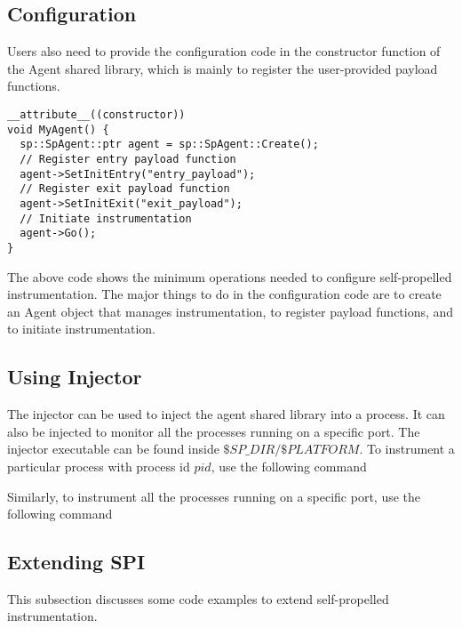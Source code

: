 \subsection{Configuration}
Users also need to provide the configuration code in the constructor
function of
the Agent shared library, which is mainly to register the user-provided payload
functions.
\lstset{numbers=left}
\begin{lstlisting}[caption=Configuration code]
__attribute__((constructor))
void MyAgent() {
  sp::SpAgent::ptr agent = sp::SpAgent::Create();
  // Register entry payload function
  agent->SetInitEntry("entry_payload");
  // Register exit payload function
  agent->SetInitExit("exit_payload");
  // Initiate instrumentation
  agent->Go();
}
\end{lstlisting}
The above code shows the minimum operations needed to configure self-propelled
instrumentation.
The major things to do in the configuration code are to create an Agent object
that manages instrumentation, to register payload functions, and to initiate
instrumentation.

\subsection{Using Injector}
The injector can be used to inject the agent shared library into a process. It
can also be injected to monitor all the processes running on a specific
port. The injector executable can be found inside $\$SP\_DIR/\$PLATFORM$. To
instrument a particular process with process id $pid$, use the following command


Similarly, to instrument all the processes running on a specific port,
use the following command




\subsection{Extending SPI}
This subsection discusses some code examples to extend self-propelled
instrumentation.
